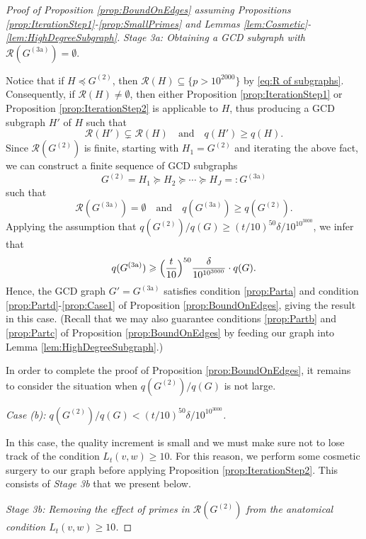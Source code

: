 \documentclass[12pt]{amsart}
\numberwithin{equation}{section}
\theoremstyle{definition}
\theoremstyle{remark}
\newcommand{\CR}{\mathcal{R}}
\renewcommand{\ge}{\geqslant}
\begin{document}
\begin{proof}[Proof of Proposition \ref{prop:BoundOnEdges} assuming Propositions \ref{prop:IterationStep1}-\ref{prop:SmallPrimes} and Lemmas \ref{lem:Cosmetic}-\ref{lem:HighDegreeSubgraph}]
\noindent
{\it Stage 3a: Obtaining a GCD subgraph with} $\CR(G^{(3\text{a})})=\emptyset$.

\medskip

Notice that if $H\preceq G^{(2)}$, then $\CR(H)\subseteq\{p>10^{2000}\}$ by \eqref{eq:R of subgraphs}. Consequently, if $\CR(H)\neq\emptyset$, then either Proposition \ref{prop:IterationStep1} or Proposition \ref{prop:IterationStep2} is applicable to $H$, thus producing a GCD subgraph $H'$ of $H$ such that
\begin{equation}\label{eq:Prop10}
\CR(H')\subsetneq \CR(H)
\quad\text{and}\quad
q(H')\ge q(H).
\end{equation}
Since $\CR(G^{(2)})$ is finite, starting with $H_1=G^{(2)}$ and iterating the above fact, we can construct a finite sequence of GCD subgraphs 
\[
G^{(2)}=H_1\succeq H_2\succeq\cdots\succeq H_J=:G^{(3\text{a})}
\] 
such that
\[
\CR(G^{(3\text{a})})=\emptyset
\quad \text{and}\quad
q(G^{(3\text{a})})\ge q(G^{(2)}).
\]
Applying the assumption that $q(G^{(2)})/q(G)\ge (t/10)^{50}\delta/10^{10^{3000}}$, we infer that
\[
q(G^{(3\text{a})})\ge \Bigl(\frac{t}{10}\Bigr)^{50}\frac{\delta}{10^{10^{3000}}} \cdot q(G).
\]
Hence, the GCD graph $G'=G^{(3\text{a})}$ satisfies condition \ref{prop:Parta} and condition \ref{prop:Partd}-\ref{prop:Case1} of Proposition \ref{prop:BoundOnEdges}, giving the result in this case. (Recall that we may also guarantee conditions  \ref{prop:Partb} and \ref{prop:Partc} of Proposition \ref{prop:BoundOnEdges} by feeding our graph into Lemma \ref{lem:HighDegreeSubgraph}.)



\medskip


In order to complete the proof of Proposition \ref{prop:BoundOnEdges}, it remains to consider the situation when $q(G^{(2)})/q(G)$ is not large.


\bigskip

\noindent 
{\it Case (b): $q(G^{(2)})/q(G)<(t/10)^{50}\delta/10^{10^{3000}}$.} 

\medskip

In this case, the quality increment is small and we must make sure not to lose track of the condition $L_t(v,w)\ge10$. For this reason, we perform some cosmetic surgery to our graph before applying Proposition \ref{prop:IterationStep2}. This consists of {\it Stage 3b} that we present below.

\bigskip

\noindent 
{\it Stage 3b: Removing the effect of primes in $\CR(G^{(2)})$ from the anatomical condition $L_t(v,w)\ge10$.}


\end{proof}
\end{document}
